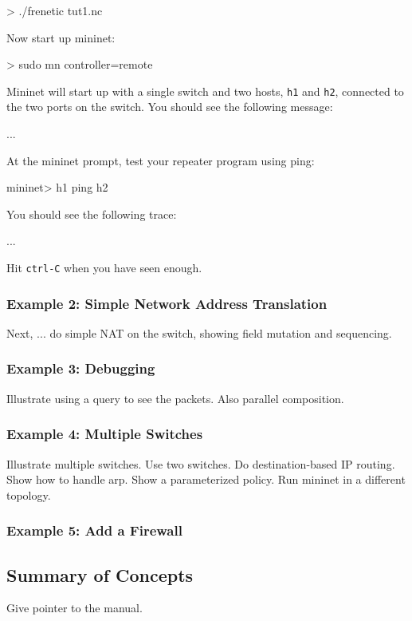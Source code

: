 \documentclass{article}
\newcommand{\code}[1]{\texttt{#1}}
\begin{document}
\begin{progeg}
> ./frenetic tut1.nc
\end{progeg}
%
Now start up mininet:
%
\begin{progeg}
> sudo mn controller=remote
\end{progeg}
%
Mininet will start up with a single switch and two hosts, 
\code{h1} and \code{h2}, connected to the two ports on the switch.
You should see the following message:
%
\begin{progeg}
...
\end{progeg}
%
At the mininet prompt, test your repeater program using ping:
%
\begin{progeg}
mininet> h1 ping h2
\end{progeg}
%
You should see the following trace:
%
\begin{progeg}
...
\end{progeg}
%
Hit \code{ctrl-C} when you have seen enough.

\subsubsection{Example 2: Simple Network Address Translation}
Next, ... do simple NAT on the switch, showing field mutation
and sequencing.

\subsubsection{Example 3: Debugging}
Illustrate using a query to see the packets.  Also parallel composition.

\subsubsection{Example 4: Multiple Switches}
Illustrate multiple switches.  Use two switches.  Do destination-based
IP routing.  Show how to handle arp.  Show a parameterized policy.
Run mininet in a different topology.

\subsubsection{Example 5:  Add a Firewall}

\subsection{Summary of Concepts}

Give pointer to the manual.
\end{document}

